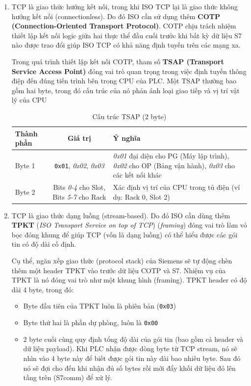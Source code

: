 \documentclass[../main.tex]{subfiles}
\begin{document}
\begin{enumerate}
    \item TCP là giao thức hướng kết nối, trong khi ISO TCP lại là giao thức không hướng kết nối (connectionless). Do đó ISO cần sử dụng thêm \textbf{COTP (Connection-Oriented Transport Protocol)}. COTP chịu trách nhiệm thiết lập kết nối logic giữa hai thực thể đầu cuối trước khi bất kỳ dữ liệu S7 nào được trao đổi giúp ISO TCP có khả năng định tuyến trên các mạng xa.

    Trong quá trình thiết lập kết nối COTP, tham số \textbf{TSAP (Transport Service Access Point)} đóng vai trò quan trọng trong việc định tuyến thông điệp đến đúng tiến trình bên trong CPU của PLC. Một TSAP thường bao gồm hai byte, trong đó cấu trúc của nó phản ánh loại giao tiếp và vị trí vật lý của CPU

    \begin{table}[H]
        \centering
        \caption{Cấu trúc TSAP (2 byte)}
        \label{tab:tsap}
        \footnotesize
        \begin{tabular}{|l|c|p{7cm}|}
            \hline
            \textbf{Thành phần} & \textbf{Giá trị} & \textbf{Ý nghĩa} \\
            \hline
            Byte 1  & \texttt{0x01}, \textit{0x02}, \textit{0x03} & \textit{0x01} đại diện cho PG (Máy lập trình), \textit{0x02} cho OP (Bảng vận hành), \textit{0x03} cho các kết nối khác \\
            \hline
            Byte 2 & Bits \textit{0-4} cho Slot, Bits \textit{5-7} cho Rack & Xác định vị trí của CPU trong tủ điện (ví dụ: Rack 0, Slot 2) \\
            \hline
        \end{tabular}
    \end{table}

    \item TCP là giao thức dạng luồng (stream-based). Do đó ISO cần dùng thêm \textbf{TPKT} (\textit{ISO Transport Service on top of TCP}) (\textit{framing}) đóng vai trò làm vỏ bọc đóng khung để giúp TCP (vốn là dạng luồng) có thể hiểu được các gói tin có độ dài cố định.

    Cụ thể, ngăn xếp giao thức (protocol stack) của Siemens sẽ tự động chèn thêm một header TPKT vào trước dữ liệu COTP và S7. Nhiệm vụ của TPKT là nó đóng vai trò như một khung hình (framing). TPKT header có độ dài 4 byte, trong đó:

    \begin{itemize}
        \item Byte đầu tiên của TPKT luôn là phiên bản (\texttt{0x03})
        \item Byte thứ hai là phần dự phòng, luôn là \texttt{0x00}
        \item 2 byte cuối cùng quy định tổng độ dài của gói tin (bao gồm cả header và dữ liệu payload). Khi PLC nhận được dòng byte từ TCP stream, nó sẽ nhìn vào 4 byte này để biết được gói tin này dài bao nhiêu byte. Sau đó nó sẽ đợi cho đến khi nhận đủ số bytes rồi mới đẩy khối dữ liệu đó lên tầng trên (S7comm) để xử lý.
    \end{itemize}
\end{enumerate}
\end{document}
